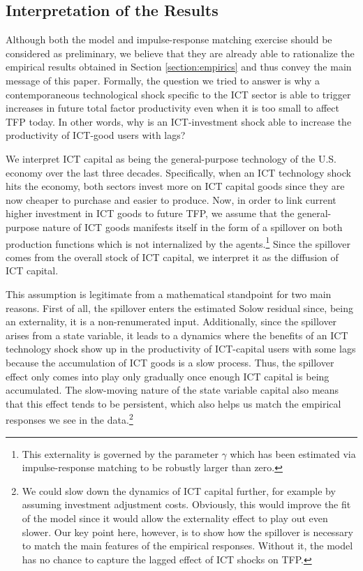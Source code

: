 \documentclass[12pt]{article}
\begin{document}
\subsection{Interpretation of the Results}\label{section:Interpretation_theory}

Although both the model and impulse-response matching exercise should be considered as preliminary, we believe that they are already able to rationalize the empirical results obtained in Section \ref{section:empirics} and thus convey the main message of this paper. Formally, the question we tried to answer is why a contemporaneous technological shock specific to the ICT sector is able to trigger increases in future total factor productivity even when it is too small to affect TFP today. In other words, why is an ICT-investment shock able to increase the productivity of ICT-good users with lags?

We interpret ICT capital as being the general-purpose technology of the U.S. economy over the last three decades. Specifically, when an ICT technology shock hits the economy, both sectors invest more on ICT capital goods since they are now cheaper to purchase and easier to produce. Now, in order to link current higher investment in ICT goods to future TFP, we assume that the general-purpose nature of ICT goods manifests itself in the form of a spillover on both production functions which is not internalized by the agents.\footnote{This externality is governed by the parameter $\gamma$ which has been estimated via impulse-response matching to be robustly larger than zero.} Since the spillover comes from the overall stock of ICT capital, we interpret it as the diffusion of ICT capital.

This assumption is legitimate from a mathematical standpoint for two main reasons. First of all, the spillover enters the estimated Solow residual since, being an externality, it is a non-renumerated input. Additionally, since the spillover arises from a state variable, it leads to a dynamics where the benefits of an ICT technology shock show up in the productivity of ICT-capital users with some lags because the accumulation of ICT goods is a slow process. Thus, the spillover effect only comes into play only gradually once enough ICT capital is being accumulated. The slow-moving nature of the state variable capital also means that this effect tends to be persistent, which also helps us match the empirical responses we see in the data.\footnote{We could slow down the dynamics of ICT capital further, for example by assuming investment adjustment costs. Obviously, this would improve the fit of the model since it would allow the externality effect to play out even slower. Our key point here, however, is to show how the spillover is necessary to match the main features of the empirical responses. Without it, the model has no chance to capture the lagged effect of ICT shocks on TFP.}
\end{document}
